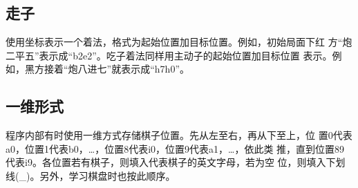 \documentclass[a4paper]{article}
\begin{document}
\subsection{走子}
使用坐标表示一个着法，格式为起始位置加目标位置。例如，初始局面下红
方``炮二平五''表示成``b2e2''。吃子着法同样用主动子的起始位置加目标位置
表示。例如，黑方接着``炮八进七''就表示成``h7h0''。

\smallboard
\begin{position}
   
   
   
   
   
      

   
   
   
   
   
      
\end{position}
\smallboard
\begin{position}
   
   
   
   
   
      

   
   
   
   
      
\end{position}

\subsection{一维形式}
\label{onedim}
程序内部有时使用一维方式存储棋子位置。先从左至右，再从下至上，位
置0代表a0，位置1代表b0，\dots，位置8代表i0，位置9代表a1，\dots，依此类
推，直到位置89代表i9。各位置若有棋子，则填入代表棋子的英文字母，若为空
位，则填入下划线(\_)。另外，学习棋盘时也按此顺序。
\end{document}
